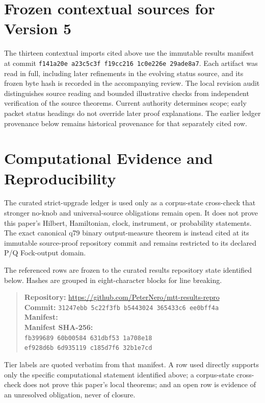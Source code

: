 \documentclass[11pt]{article}
\theoremstyle{definition}
\theoremstyle{remark}
\begin{document}


\section*{Frozen contextual sources for Version 5}
The thirteen contextual imports cited above use the immutable results
manifest at commit
\texttt{f141a20e a23c5c3f f19cc216 1c0e226e 29ade8a7}. Each artifact was read
in full, including later refinements in the evolving status source, and
its frozen byte hash is recorded in the accompanying review. The local
revision audit distinguishes source reading and bounded illustrative checks
from independent verification of the source theorems. Current authority
determines scope; early packet status headings do not override later
proof explanations. The earlier ledger provenance below remains historical
provenance for that separately cited row.

\section*{Computational Evidence and Reproducibility}
The curated strict-upgrade ledger is used only as a corpus-state cross-check that stronger no-knob and universal-source obligations remain open. It does not prove this paper's Hilbert, Hamiltonian, clock, instrument, or probability statements. The exact canonical q79 binary output-measure theorem is instead cited at its immutable source-proof repository commit and remains restricted to its declared P/Q Fock-output domain.

The referenced rows are frozen to the curated results repository state identified below. Hashes are grouped in eight-character blocks for line breaking.
\begin{quote}\small
\textbf{Repository:} \url{https://github.com/PeterNero/mtt-results-repro}\\
\textbf{Commit:} \texttt{31247ebb 5c22f3fb b5443024 365433c6 ee0bff4a}\\
\textbf{Manifest:} \\
\textbf{Manifest SHA-256:}\\
\texttt{fb399689 60b00584 631dbf53 1a708e18}\\
\texttt{ef928d6b 6d935119 c185d7f6 32b1e7cd}
\end{quote}

Tier labels are quoted verbatim from that manifest. A row used directly supports only the specific computational statement identified above; a corpus-state cross-check does not prove this paper's local theorems; and an open row is evidence of an unresolved obligation, never of closure.
\end{document}

